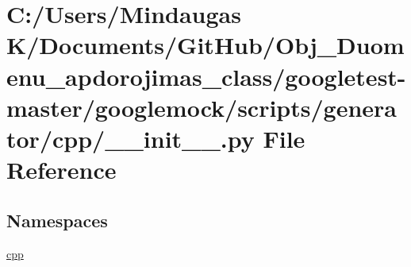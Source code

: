 \hypertarget{googletest-master_2googlemock_2scripts_2generator_2cpp_2____init_____8py}{}\section{C\+:/\+Users/\+Mindaugas K/\+Documents/\+Git\+Hub/\+Obj\+\_\+\+Duomenu\+\_\+apdorojimas\+\_\+class/googletest-\/master/googlemock/scripts/generator/cpp/\+\_\+\+\_\+init\+\_\+\+\_\+.py File Reference}
\label{googletest-master_2googlemock_2scripts_2generator_2cpp_2____init_____8py}
\subsection*{Namespaces}
\begin{DoxyCompactItemize}
\item 
 \mbox{\hyperlink{namespacecpp}{cpp}}
\end{DoxyCompactItemize}

